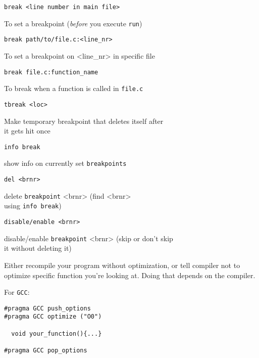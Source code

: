 \documentclass[10pt, a4paper, english, parskip, twocolumn]{scrartcl}
\newcommand{\code}[1]{\texttt{#1}}
\newcommand{\gdbsection}[1]{\begin{mdframed}[frametitlebackgroundcolor=bittersweet,style=section,
frametitle=#1]\end{mdframed}}
\begin{document}
\begin{lstlisting}[belowskip=-0.8 \baselineskip]
break <line number in main file>
\end{lstlisting}
%
\quad To set a breakpoint (\textit{before} you execute \code{run})
%
\begin{lstlisting}[belowskip=-0.8 \baselineskip]
break path/to/file.c:<line_nr>
\end{lstlisting}
\quad To set a breakpoint on <line\_nr> in specific file
%
\begin{lstlisting}[belowskip=-0.8 \baselineskip]
break file.c:function_name
\end{lstlisting}
\quad To break when a function is called in \code{file.c}
%
\begin{lstlisting}[belowskip=-0.8 \baselineskip]
tbreak <loc>
\end{lstlisting}
\quad Make temporary breakpoint that deletes itself after \\
\quad it gets hit once
%
\begin{lstlisting}[belowskip=-0.8 \baselineskip]
info break
\end{lstlisting}
\quad show info on currently set \code{breakpoints}
%
\begin{lstlisting}[belowskip=-0.8 \baselineskip]
del <brnr>
\end{lstlisting}
\quad delete \code{breakpoint} <brnr> (find <brnr>\\
\quad using \code{info break})
%
\begin{lstlisting}[belowskip=-0.8 \baselineskip]
disable/enable <brnr>
\end{lstlisting}
\quad disable/enable \code{breakpoint} <brnr> (skip or don't skip \\
\quad it without deleting it)
%









\gdbsection{gdb and ``value has been optimized out''}

Either recompile your program without optimization, or tell compiler not to optimize specific
function you're looking at. Doing that depends on the compiler.


For \code{GCC}:
\begin{lstlisting}[belowskip=-0.8 \baselineskip]
#pragma GCC push_options
#pragma GCC optimize ("O0")

  void your_function(){...}

#pragma GCC pop_options
\end{lstlisting}
%
\end{document}

